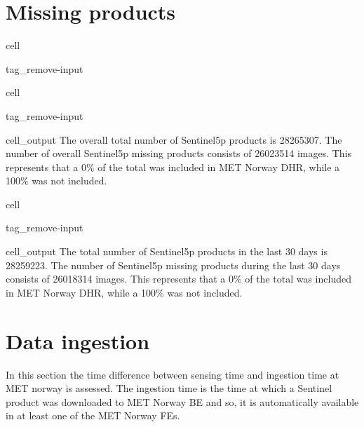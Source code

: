 \documentclass[letterpaper,10pt,english]{jupyterBook}
\begin{document}
\section{Missing products}
\label{\detokenize{S5p_portals:missing-products}}
\begin{sphinxuseclass}{cell}
\begin{sphinxuseclass}{tag_remove-input}
\end{sphinxuseclass}
\end{sphinxuseclass}
\begin{sphinxuseclass}{cell}
\begin{sphinxuseclass}{tag_remove-input}\begin{sphinxVerbatimOutput}

\begin{sphinxuseclass}{cell_output}
\sphinxAtStartPar
The overall total number of Sentinel\sphinxhyphen{}5p products is 28265307. The number of overall Sentinel\sphinxhyphen{}5p missing products consists of 26023514 images. This represents that a 0\% of the total was included in MET Norway DHR, while a 100\% was not included.

\end{sphinxuseclass}\end{sphinxVerbatimOutput}

\end{sphinxuseclass}
\end{sphinxuseclass}
\begin{sphinxuseclass}{cell}
\begin{sphinxuseclass}{tag_remove-input}\begin{sphinxVerbatimOutput}

\begin{sphinxuseclass}{cell_output}
\sphinxAtStartPar
The total number of Sentinel\sphinxhyphen{}5p products in the last 30 days is 28259223. The number of Sentinel\sphinxhyphen{}5p missing products during the last 30 days consists of 26018314 images. This represents that a 0\% of the total was included in MET Norway DHR, while a 100\% was not included.

\end{sphinxuseclass}\end{sphinxVerbatimOutput}

\end{sphinxuseclass}
\end{sphinxuseclass}

\section{Data ingestion}
\label{\detokenize{S5p_portals:data-ingestion}}
\sphinxAtStartPar
In this section the time difference between sensing time and ingestion time at MET norway is assessed. The ingestion time is the time at which a Sentinel product was downloaded to MET Norway BE and so, it is automatically available in at least one of the MET Norway FEs.
\end{document}
